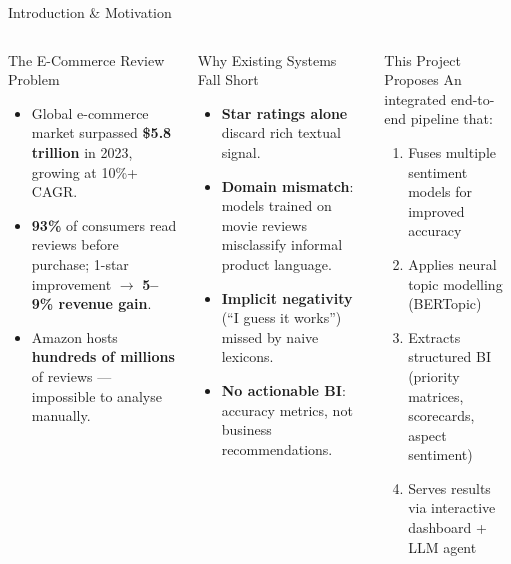 \documentclass[aspectratio=169,xcolor=dvipsnames,10pt]{beamer}
\begin{document}
\begin{frame}{Introduction \& Motivation}
    \begin{columns}[T]
        \begin{block}{The E-Commerce Review Problem}
            \footnotesize
            \begin{itemize}
                \item Global e-commerce market surpassed \textbf{\$5.8 trillion} in 2023, growing at 10\%+ CAGR.
                \item \textbf{93\%} of consumers read reviews before purchase; 1-star improvement $\rightarrow$ \textbf{5--9\% revenue gain}.
                \item Amazon hosts \textbf{hundreds of millions} of reviews --- impossible to analyse manually.
            \end{itemize}
        \end{block}

        \vspace{0.4em}
        \begin{alertblock}{Why Existing Systems Fall Short}
            \footnotesize
            \begin{itemize}
                \item \textbf{Star ratings alone} discard rich textual signal.
                \item \textbf{Domain mismatch}: models trained on movie reviews misclassify informal product language.
                \item \textbf{Implicit negativity} (``I guess it works'') missed by naive lexicons.
                \item \textbf{No actionable BI}: accuracy metrics, not business recommendations.
            \end{itemize}
        \end{alertblock}

        \begin{exampleblock}{This Project Proposes}
            \footnotesize
            An integrated end-to-end pipeline that:
            \begin{enumerate}
                \item Fuses multiple sentiment models for improved accuracy
                \item Applies neural topic modelling (BERTopic)
                \item Extracts structured BI (priority matrices, scorecards, aspect sentiment)
                \item Serves results via interactive dashboard + LLM agent
            \end{enumerate}
        \end{exampleblock}
    \end{columns}
\end{frame}
\end{document}
